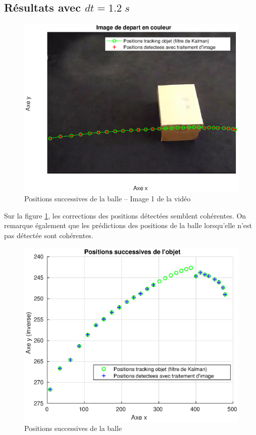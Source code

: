 \subsection{Résultats avec $ dt = 1.2 \; s $}

\begin{figure}[H]
\caption{Positions successives de la balle \--- Image 1 de la vidéo}
\centerline{\includegraphics[width=20cm]{Images/Resultats/ImageDeDepartEnCourleur}}
\label{1}
\end{figure}

Sur la figure \ref{1}, les corrections des positions détectées semblent cohérentes. On remarque également que les prédictions des positions de la balle lorsqu'elle n'est pas détectée sont cohérentes.

\begin{figure}[H]
\caption{Positions successives de la balle}
\centerline{\includegraphics[width=20cm]{Images/Resultats/PositionsSuccessivesDeLObjet}}
\label{2}
\end{figure}

